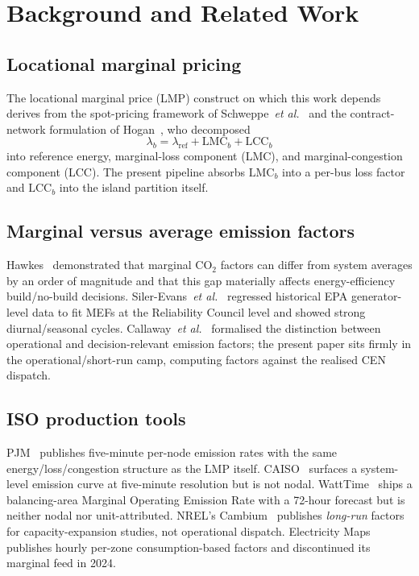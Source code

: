 \section{Background and Related Work}
\label{sec:related}

\subsection{Locational marginal pricing}
The locational marginal price (LMP) construct on which this work
depends derives from the spot-pricing framework of
Schweppe~\textit{et al.}~\cite{Schweppe1988} and the contract-network
formulation of Hogan~\cite{Hogan1992}, who decomposed
\begin{equation}
\lambda_b = \lambda_{\mathrm{ref}} +
            \mathrm{LMC}_b + \mathrm{LCC}_b
\label{eq:lmp-decomp}
\end{equation}
into reference energy, marginal-loss component (LMC), and
marginal-congestion component (LCC).  The present pipeline absorbs
$\mathrm{LMC}_b$ into a per-bus loss factor and $\mathrm{LCC}_b$ into
the island partition itself.

\subsection{Marginal versus average emission factors}
Hawkes~\cite{Hawkes2010} demonstrated that marginal CO$_2$ factors
can differ from system averages by an order of magnitude and that
this gap materially affects energy-efficiency build/no-build
decisions.  Siler-Evans~\textit{et al.}~\cite{SilerEvans2012}
regressed historical EPA generator-level data to fit MEFs at the
Reliability Council level and showed strong diurnal/seasonal cycles.
Callaway~\textit{et al.}~\cite{Callaway2018} formalised the
distinction between operational and decision-relevant emission
factors; the present paper sits firmly in the operational/short-run
camp, computing factors against the realised CEN dispatch.

\subsection{ISO production tools}
PJM~\cite{PJMLME2024,PJMPrimer} publishes five-minute per-node
emission rates with the same energy/loss/congestion structure as the
LMP itself.  CAISO~\cite{CAISOOutlook} surfaces a system-level
emission curve at five-minute resolution but is not nodal.
WattTime~\cite{WattTime2024} ships a balancing-area Marginal
Operating Emission Rate with a 72-hour forecast but is neither nodal
nor unit-attributed.  NREL's Cambium~\cite{NRELCambium} publishes
\emph{long-run} factors for capacity-expansion studies, not
operational dispatch.  Electricity
Maps~\cite{ElectricityMaps2024,ElectricityMapsCritique} publishes
hourly per-zone consumption-based factors and discontinued its
marginal feed in 2024.

